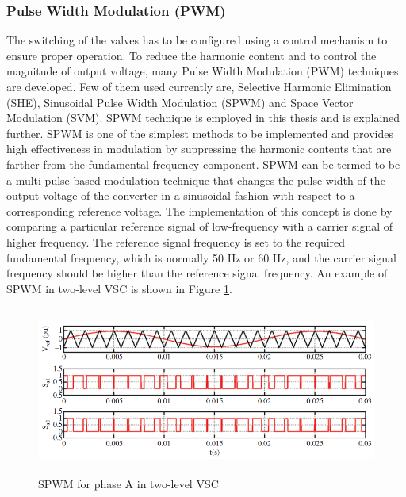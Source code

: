 \subsubsection{Pulse Width Modulation (PWM)}
The switching of the valves has to be configured using a control mechanism to ensure proper operation. To reduce the harmonic content and to control the magnitude of output voltage, many Pulse Width Modulation (\gls{PWM}) techniques are developed. Few of them used currently are, Selective Harmonic Elimination (SHE), Sinusoidal Pulse Width Modulation (SPWM) and Space Vector Modulation (SVM). SPWM technique is employed in this thesis and is explained further. SPWM is one of the simplest methods to be implemented and provides high effectiveness in modulation by suppressing the harmonic contents that are farther from the fundamental frequency component. SPWM can be termed to be a multi-pulse based modulation technique that changes the pulse width of the output voltage of the converter in a sinusoidal fashion with respect to a corresponding reference voltage. The implementation of this concept is done by comparing a particular reference signal of low-frequency with a carrier signal of higher frequency. The reference signal frequency is set to the required fundamental frequency, which is normally 50 Hz or 60 Hz, and the carrier signal frequency should be higher than the reference signal frequency. An example of SPWM in two-level \gls{VSC} is shown in Figure \ref{fig:2levelVSC_switching}.

\begin{figure}[H]
\centering
    \includegraphics[height = 5.5cm,width = 13.5cm]{Diagrams/Chapter_2/2levelVSC_switching.PNG}
    \caption{SPWM for phase A in two-level VSC \cite{noauthor_appendix_2014}}
    \label{fig:2levelVSC_switching}
\end{figure}


